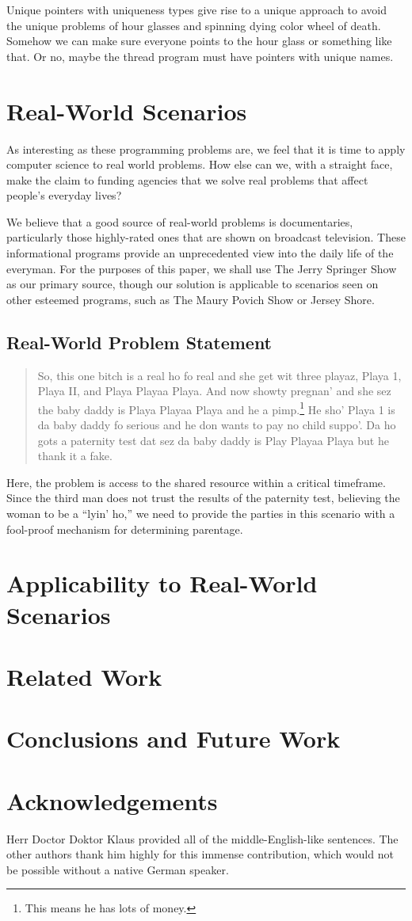 \documentclass[10pt,twocolumn,letterpaper]{article}
\begin{document}
Unique pointers with uniqueness types give rise to a unique approach to avoid the unique problems of hour glasses and spinning dying color wheel of death. Somehow we can make sure everyone points to the hour glass or something like that. Or no, maybe the thread program must have pointers with unique names.


\section{Real-World Scenarios}
As interesting as these programming problems are, we feel that it is time to apply computer science to real world problems. How else can we, with a straight face, make the claim to funding agencies that we solve real problems that affect people's everyday lives?

We believe that a good source of real-world problems is documentaries, particularly those highly-rated ones that are shown on broadcast television. These informational programs provide an unprecedented view into the daily life of the everyman. For the purposes of this paper, we shall use The Jerry Springer Show as our primary source, though our solution is applicable to scenarios seen on other esteemed  programs, such as The Maury Povich Show or Jersey Shore.

\subsection{Real-World Problem Statement}

\begin{quote}
So, this one bitch is a real ho fo real and she get wit three playaz, Playa 1, Playa II, and Playa Playaa Playa. And now showty pregnan' and she sez the baby daddy is Playa Playaa Playa and he a pimp.\footnote{This means he has lots of money.} He sho' Playa 1 is da baby daddy fo serious and he don wants to pay no child suppo'. Da ho gots a paternity test dat sez da baby daddy is Play Playaa Playa but he thank it a fake.
\end{quote}

Here, the problem is access to the shared resource within a critical timeframe. Since the third man does not trust the results of the paternity test, believing the woman to be a ``lyin' ho,'' we need to provide the parties in this scenario with a fool-proof mechanism for determining parentage.

\section{Applicability to Real-World Scenarios}
\section{Related Work}
\section{Conclusions and Future Work}
\section{Acknowledgements}
Herr Doctor Doktor Klaus provided all of the middle-English-like sentences. The other authors thank him highly for this immense contribution, which would not be possible without a native German speaker.
\end{document}
